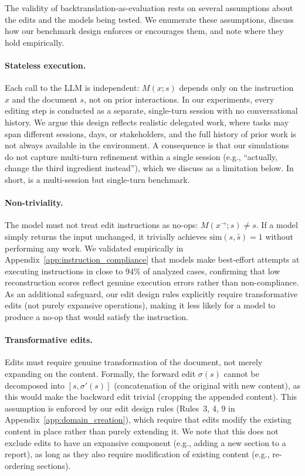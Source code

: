 \documentclass{article} %
\begin{document}
The validity of backtranslation-as-evaluation rests on several assumptions about the edits and the models being tested. We enumerate these assumptions, discuss how our benchmark design enforces or encourages them, and note where they hold empirically.

\paragraph{Stateless execution.} Each call to the LLM is independent: $M(x; s)$ depends only on the instruction $x$ and the document $s$, not on prior interactions. In our experiments, every editing step is conducted as a separate, single-turn session with no conversational history. We argue this design reflects realistic delegated work, where tasks may span different sessions, days, or stakeholders, and the full history of prior work is not always available in the environment. A consequence is that our simulations do not capture multi-turn refinement within a single session (e.g., ``actually, change the third ingredient instead''), which we discuss as a limitation below. In short, \benchmark{} is a multi-session but single-turn benchmark.

\paragraph{Non-triviality.} The model must not treat edit instructions as no-ops: $M(x^{\rightarrow}; s) \neq s$. If a model simply returns the input unchanged, it trivially achieves $\mathrm{sim}(s, \hat{s}) = 1$ without performing any work. We validated empirically in Appendix~\ref{app:instruction_compliance} that models make best-effort attempts at executing instructions in close to 94\% of analyzed cases, confirming that low reconstruction scores reflect genuine execution errors rather than non-compliance. As an additional safeguard, our edit design rules explicitly require transformative edits (not purely expansive operations), making it less likely for a model to produce a no-op that would satisfy the instruction.

\paragraph{Transformative edits.} Edits must require genuine transformation of the document, not merely expanding on the content. Formally, the forward edit $\sigma(s)$ cannot be decomposed into $[s, \sigma'(s)]$ (concatenation of the original with new content), as this would make the backward edit trivial (cropping the appended content). This assumption is enforced by our edit design rules (Rules~3, 4, 9 in Appendix~\ref{app:domain_creation}), which require that edits modify the existing content in place rather than purely extending it. We note that this does not exclude edits to have an expansive component (e.g., adding a new section to a report), as long as they also require modification of existing content (e.g., re-ordering sections).
\end{document}

